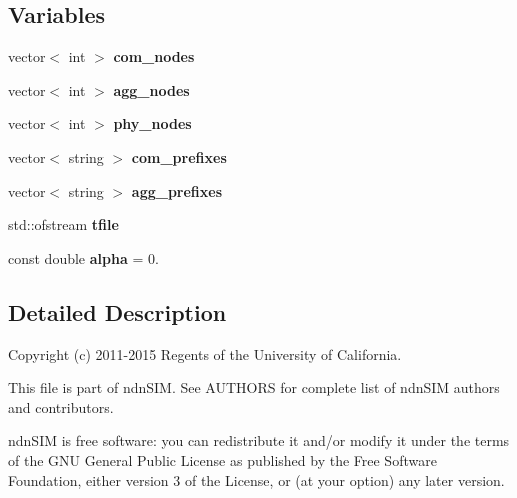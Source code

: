 \subsection*{Variables}
\begin{DoxyCompactItemize}
\item 
vector$<$ int $>$ {\bfseries com\+\_\+nodes}\hypertarget{namespacens3_a0ac7235e1fa11da0e39314a7aa7d4d8f}{}\label{namespacens3_a0ac7235e1fa11da0e39314a7aa7d4d8f}

\item 
vector$<$ int $>$ {\bfseries agg\+\_\+nodes}\hypertarget{namespacens3_aec5009cc827393c47563606ea9e3b767}{}\label{namespacens3_aec5009cc827393c47563606ea9e3b767}

\item 
vector$<$ int $>$ {\bfseries phy\+\_\+nodes}\hypertarget{namespacens3_a91e4dd0ab7435c4c78215a3d6a02124b}{}\label{namespacens3_a91e4dd0ab7435c4c78215a3d6a02124b}

\item 
vector$<$ string $>$ {\bfseries com\+\_\+prefixes}\hypertarget{namespacens3_ad2cb85ec0057d369036382fc4175e073}{}\label{namespacens3_ad2cb85ec0057d369036382fc4175e073}

\item 
vector$<$ string $>$ {\bfseries agg\+\_\+prefixes}\hypertarget{namespacens3_a3ada5fca75f5c55f2af773e18900fc5e}{}\label{namespacens3_a3ada5fca75f5c55f2af773e18900fc5e}

\item 
std\+::ofstream {\bfseries tfile}\hypertarget{namespacens3_a5e4b80891b7972ac81c6b6c17a755492}{}\label{namespacens3_a5e4b80891b7972ac81c6b6c17a755492}

\item 
const double {\bfseries alpha} = 0.\hypertarget{namespacens3_a010367f66586d549bcee7861a914d6b2}{}\label{namespacens3_a010367f66586d549bcee7861a914d6b2}

\end{DoxyCompactItemize}


\subsection{Detailed Description}
Copyright (c) 2011-\/2015 Regents of the University of California.

This file is part of ndn\+S\+IM. See A\+U\+T\+H\+O\+RS for complete list of ndn\+S\+IM authors and contributors.

ndn\+S\+IM is free software\+: you can redistribute it and/or modify it under the terms of the G\+NU General Public License as published by the Free Software Foundation, either version 3 of the License, or (at your option) any later version.

